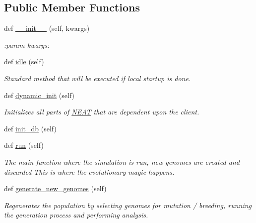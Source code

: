 \subsection*{Public Member Functions}
\begin{DoxyCompactItemize}
\item 
def \hyperlink{classNEAT__PyGenetics_1_1NEAT_1_1Director_1_1MainDirector_1_1MainDirector_ab14b0501fc1b74c88b2e57f2c427f556}{\+\_\+\+\_\+init\+\_\+\+\_\+} (self, kwargs)
\begin{DoxyCompactList}\small\item\em \+:param kwargs\+: \end{DoxyCompactList}\item 
def \hyperlink{classNEAT__PyGenetics_1_1NEAT_1_1Director_1_1MainDirector_1_1MainDirector_ae092b13a0703771ac0813e67fb872362}{idle} (self)
\begin{DoxyCompactList}\small\item\em Standard method that will be executed if local startup is done. \end{DoxyCompactList}\item 
def \hyperlink{classNEAT__PyGenetics_1_1NEAT_1_1Director_1_1MainDirector_1_1MainDirector_a145a35253c447b14b3a834cd6bbd6b15}{dynamic\+\_\+init} (self)
\begin{DoxyCompactList}\small\item\em Initializes all parts of \hyperlink{namespaceNEAT__PyGenetics_1_1NEAT}{N\+E\+AT} that are dependent upon the client. \end{DoxyCompactList}\item 
def \hyperlink{classNEAT__PyGenetics_1_1NEAT_1_1Director_1_1MainDirector_1_1MainDirector_a1d54dab714e07b9ba097b118994bc7e0}{init\+\_\+db} (self)
\item 
def \hyperlink{classNEAT__PyGenetics_1_1NEAT_1_1Director_1_1MainDirector_1_1MainDirector_a0dc96b0a3075b0522e9179e154e3bfdc}{run} (self)
\begin{DoxyCompactList}\small\item\em The main function where the simulation is run, new genomes are created and discarded This is where the evolutionary magic happens. \end{DoxyCompactList}\item 
def \hyperlink{classNEAT__PyGenetics_1_1NEAT_1_1Director_1_1MainDirector_1_1MainDirector_a62d21475b9a55ebf26b731e1af031998}{generate\+\_\+new\+\_\+genomes} (self)
\begin{DoxyCompactList}\small\item\em Regenerates the population by selecting genomes for mutation / breeding, running the generation process and performing analysis. \end{DoxyCompactList}\item 

\end{DoxyCompactItemize}

